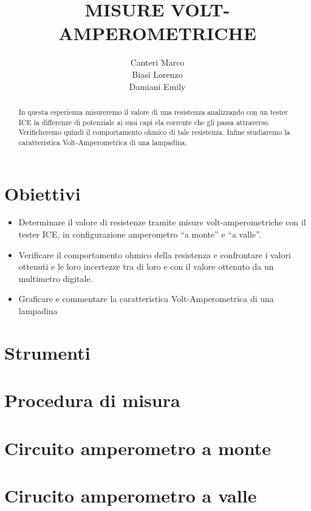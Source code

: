 \documentclass[12pt,titlepage]{article}
\title{\textbf{MISURE VOLT- AMPEROMETRICHE} }
\author{Canteri Marco\\Biasi Lorenzo\\Damiani Emily}
\date{}
\begin{document}
	\maketitle
	\tableofcontents
	\renewcommand{\abstractname}{Abstract}
	
	\begin{abstract}
In questa esperienza misureremo il valore di una resistenza analizzando con un tester ICE la differenze di potenziale ai suoi capi ela corrente che gli passa attraverso. Verificheremo quindi il comportamento ohmico di tale resistenza. Infine studiaremo la caratteristica Volt-Amperometrica di una lampadina.
	\end{abstract}

\section{Obiettivi}
\begin{itemize}
\item Determinare il valore di resistenze tramite misure volt-amperometriche con il tester
ICE, in configurazione amperometro “a monte” e “a valle”.
\item Verificare il comportamento ohmico della resistenza e confrontare i valori ottenuti e
le loro incertezze tra di loro e con il valore ottenuto da un multimetro digitale. 
\item Graficare e commentare la caratteristica Volt-Amperometrica di una lampadina
\end{itemize}
\section{Strumenti}
\section{Procedura di misura}
\section{Circuito amperometro a monte}
\section{Cirucito amperometro a valle}
\end{document}
